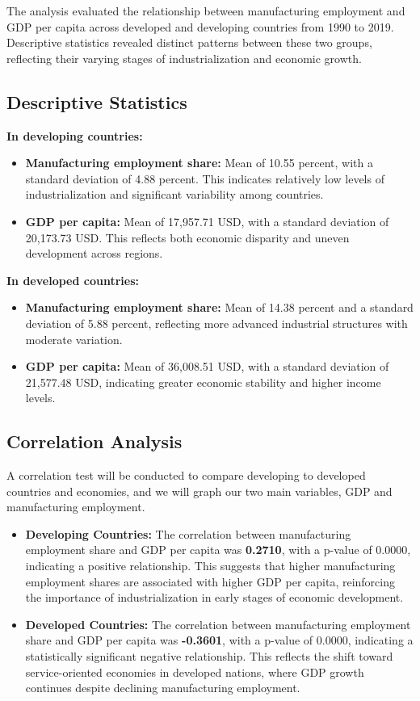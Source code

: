 \documentclass[12pt]{article}
\begin{document}
The analysis evaluated the relationship between manufacturing employment and GDP per capita across developed and developing countries from 1990 to 2019. Descriptive statistics revealed distinct patterns between these two groups, reflecting their varying stages of industrialization and economic growth.

\subsection{Descriptive Statistics}

\textbf{In developing countries:}
\begin{itemize}
\item \textbf{Manufacturing employment share:} Mean of 10.55 percent, with a standard deviation of 4.88 percent. This indicates relatively low levels of industrialization and significant variability among countries.
\item \textbf{GDP per capita:} Mean of 17,957.71 USD, with a standard deviation of 20,173.73 USD. This reflects both economic disparity and uneven development across regions.
\end{itemize}

\textbf{In developed countries:}
\begin{itemize}
\item \textbf{Manufacturing employment share:} Mean of 14.38 percent and a standard deviation of 5.88 percent, reflecting more advanced industrial structures with moderate variation.
\item \textbf{GDP per capita:} Mean of 36,008.51 USD, with a standard deviation of 21,577.48 USD, indicating greater economic stability and higher income levels.
\end{itemize}

\subsection{Correlation Analysis}
A correlation test will be conducted to compare developing to developed countries and economies, and we will graph our two main variables, GDP and manufacturing employment.
\begin{itemize}
\item \textbf{Developing Countries:} The correlation between manufacturing employment share and GDP per capita was \textbf{0.2710}, with a p-value of 0.0000, indicating a positive relationship. This suggests that higher manufacturing employment shares are associated with higher GDP per capita, reinforcing the importance of industrialization in early stages of economic development.
\item \textbf{Developed Countries:} The correlation between manufacturing employment share and GDP per capita was \textbf{-0.3601}, with a p-value of 0.0000, indicating a statistically significant negative relationship. This reflects the shift toward service-oriented economies in developed nations, where GDP growth continues despite declining manufacturing employment.
\end{itemize}
\end{document}

